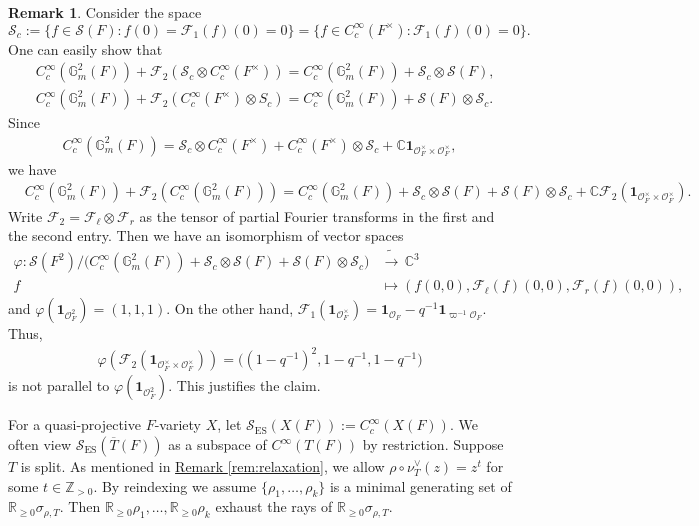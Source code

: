 \documentclass[10pt]{amsart}
\theoremstyle{definition}
\newtheorem{remark}[theorem]{Remark}
\numberwithin{equation}{section}
\numberwithin{equation}{subsection}
\newcommand{\ZZ}{\mathbb{Z}}
\newcommand{\CC}{\mathbb{C}}
\newcommand{\GG}{\mathbb{G}}
\begin{document}
\begin{remark}
    Consider the space $$\mathcal{S}_c:=\{f\in \mathcal{S}(F): f(0)=\mathcal{F}_1(f)(0)=0\}=\{f\in C^\infty_c(F^\times):\mathcal{F}_1(f)(0)=0\}.$$
    One can easily show that 
    \begin{align*}
        &C_c^\infty(\GG_m^2(F))+\mathcal{F}_{2}(\mathcal{S}_c\otimes C^\infty_c(F^\times))=C^\infty_c(\GG_m^2(F))+\mathcal{S}_c\otimes \mathcal{S}(F),\\
        &C_c^\infty(\GG_m^2(F))+\mathcal{F}_{2}(C^\infty_c(F^\times)\otimes S_c)=C_c^\infty(\GG_m^2(F))+\mathcal{S}(F)\otimes \mathcal{S}_c.
    \end{align*}
    Since 
    \begin{align*}
        C^\infty_c(\GG_m^2(F))=\mathcal{S}_c\otimes C^\infty_c(F^\times)+C^\infty_c(F^\times)\otimes \mathcal{S}_c+\CC\mathbf1{_{\mathcal{O}_F^\times\times \mathcal{O}_F^\times}},
    \end{align*}
 we have
    \begin{align*}
       &C^\infty_c(\GG_m^2(F))+\mathcal{F}_2(C^\infty_c(\GG_m^2(F)))=C^\infty_c(\GG_m^2(F))+\mathcal{S}_c\otimes \mathcal{S}(F)+ \mathcal{S}(F)\otimes \mathcal{S}_c+\CC\mathcal{F}_2(\mathbf{1}_{\mathcal{O}_F^\times\times \mathcal{O}_F^\times}).
    \end{align*}
Write $\mathcal{F}_2=\mathcal{F}_\ell\otimes\mathcal{F}_r$ as the tensor of partial Fourier transforms in the first and the second entry. Then we have an isomorphism of vector spaces
\begin{align*}
    \varphi:\mathcal{S}(F^2)/\bigg(C^\infty_c(\GG_m^2(F))+\mathcal{S}_c\otimes \mathcal{S}(F)+ \mathcal{S}(F)\otimes \mathcal{S}_c\bigg)&\tilde{\longrightarrow}\, \CC^3\\
    f&\mapsto (f(0,0),\mathcal{F}_\ell(f)(0,0),\mathcal{F}_r(f)(0,0)),
\end{align*}
and $\varphi(\mathbf{1}_{\mathcal{O}_F^2})=(1,1,1).$ On the other hand, $\mathcal{F}_1(\mathbf{1}_{\mathcal{O}_F^\times})=\mathbf{1}_{\mathcal{O}_F}-q^{-1}\mathbf{1}_{\varpi^{-1}\mathcal{O}_F}.$ Thus,
\begin{align*}
    \varphi(\mathcal{F}_2(\mathbf{1}_{\mathcal{O}_F^\times\times \mathcal{O}_F^\times}))=\big((1-q^{-1})^2,1-q^{-1},1-q^{-1}\big)
\end{align*}
is not parallel to $\varphi(\mathbf{1}_{\mathcal{O}_F^2}).$ This justifies the claim. 
\end{remark}

For a quasi-projective $F$-variety $X$, let $\mathcal{S}_{\mathrm{ES}}(X(F)):=C^\infty_c(X(F)).$ We often view $\mathcal{S}_{\mathrm{ES}}(\overline{T}(F))$ as a subspace of $C^\infty(T(F))$ by restriction. Suppose $T$ is split. As mentioned in \hyperref[rem:relaxation]{Remark \ref{rem:relaxation}}, we allow $\rho\circ \nu_T^\lor(z)=z^t$ for some $t\in \ZZ_{>0}$. By reindexing we assume $\{\rho_1,\ldots,\rho_k\}$ is a minimal generating set of $\mathbb{R}_{\geq 0}\sigma_{\rho,T}$. Then $\mathbb{R}_{\geq 0}\rho_1,\ldots,\mathbb{R}_{\geq 0}\rho_k$ exhaust the rays of $\mathbb{R}_{\geq 0}\sigma_{\rho,T}$. 
\end{document}
